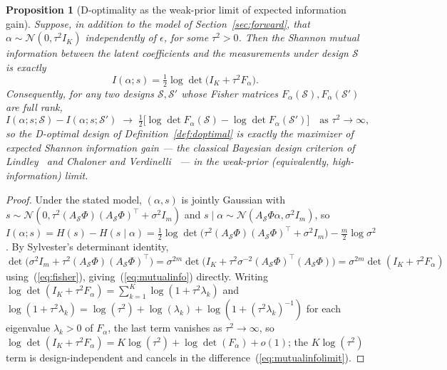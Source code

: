 \documentclass[11pt]{article}
\newtheorem{Proposition}{Proposition}
\begin{document}
\begin{Proposition}[D-optimality as the weak-prior limit of expected information gain]
\label{prop:mutualinfo}
Suppose, in addition to the model of Section~\ref{sec:forward}, that $\alpha\sim\mathcal{N}(0,\tau^2I_K)$ independently of $\epsilon$, for some $\tau^2>0$. Then the Shannon mutual information between the latent coefficients and the measurements under design $\mathcal{S}$ is exactly
\begin{equation}
I(\alpha;s) = \tfrac12\log\det\big(I_K+\tau^2F_\alpha\big).
\label{eq:mutualinfo}
\end{equation}
Consequently, for any two designs $\mathcal{S},\mathcal{S}'$ whose Fisher matrices $F_\alpha(\mathcal{S}),F_\alpha(\mathcal{S}')$ are full rank,
\begin{equation}
I(\alpha;s;\mathcal{S}) - I(\alpha;s;\mathcal{S}') \;\longrightarrow\; \tfrac12\big[\log\det F_\alpha(\mathcal{S}) - \log\det F_\alpha(\mathcal{S}')\big] \quad\text{as } \tau^2\to\infty,
\label{eq:mutualinfolimit}
\end{equation}
so the D-optimal design of Definition~\ref{def:doptimal} is exactly the maximizer of expected Shannon information gain --- the classical Bayesian design criterion of Lindley~\citep{ref32} and Chaloner and Verdinelli~\citep{ref33} --- in the weak-prior (equivalently, high-information) limit.
\end{Proposition}
\begin{proof}
Under the stated model, $(\alpha,s)$ is jointly Gaussian with $s\sim\mathcal{N}(0,\tau^2(A_\mathcal{S}\Phi)(A_\mathcal{S}\Phi)^\top+\sigma^2I_m)$ and $s\mid\alpha\sim\mathcal{N}(A_\mathcal{S}\Phi\alpha,\sigma^2I_m)$, so $I(\alpha;s)=H(s)-H(s\mid\alpha)=\tfrac12\log\det\big(\tau^2(A_\mathcal{S}\Phi)(A_\mathcal{S}\Phi)^\top+\sigma^2I_m\big)-\tfrac{m}{2}\log\sigma^2$. By Sylvester's determinant identity, $\det\big(\sigma^2I_m+\tau^2(A_\mathcal{S}\Phi)(A_\mathcal{S}\Phi)^\top\big)=\sigma^{2m}\det\big(I_K+\tau^2\sigma^{-2}(A_\mathcal{S}\Phi)^\top(A_\mathcal{S}\Phi)\big)=\sigma^{2m}\det(I_K+\tau^2F_\alpha)$ using~(\ref{eq:fisher}), giving~(\ref{eq:mutualinfo}) directly. Writing $\log\det(I_K+\tau^2F_\alpha)=\sum_{k=1}^K\log(1+\tau^2\lambda_k)$ and $\log(1+\tau^2\lambda_k)=\log(\tau^2)+\log(\lambda_k)+\log(1+(\tau^2\lambda_k)^{-1})$ for each eigenvalue $\lambda_k>0$ of $F_\alpha$, the last term vanishes as $\tau^2\to\infty$, so $\log\det(I_K+\tau^2F_\alpha)=K\log(\tau^2)+\log\det(F_\alpha)+o(1)$; the $K\log(\tau^2)$ term is design-independent and cancels in the difference~(\ref{eq:mutualinfolimit}).
\end{proof}
\end{document}
